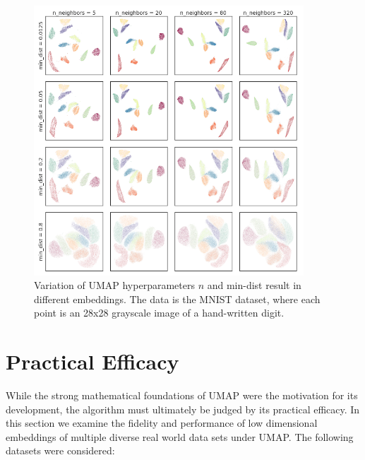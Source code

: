 \documentclass[12pt]{article}
\begin{document}
\begin{figure}
    \centering
    \includegraphics[width=0.9\textwidth]{hyperparameters_mnist.png}
    \caption{Variation of UMAP hyperparameters $n$ and min-dist result in different embeddings. The data is the MNIST dataset, where each point is an 28x28 grayscale image of a hand-written digit.}
    \label{fig:hyperparameters-mnist}
\end{figure}

\section{Practical Efficacy}\label{experiments}

While the strong mathematical foundations of UMAP were the motivation for its development, the algorithm must ultimately be judged by its practical efficacy. In this section we examine the fidelity and performance of low dimensional embeddings of multiple diverse real world data sets under UMAP. The following datasets were considered:
\end{document}
